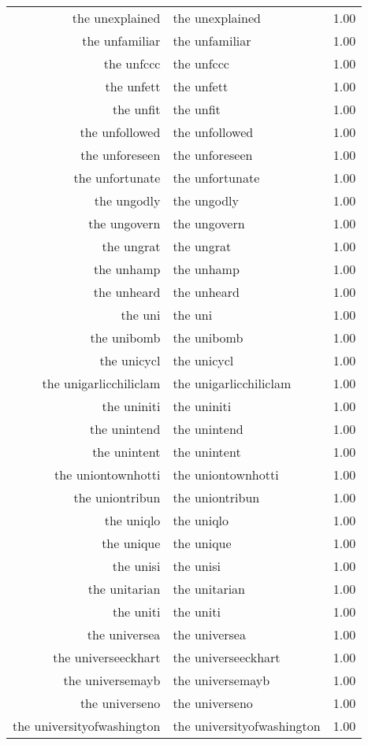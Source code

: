 \begin{table}[ht]
\begin{tabular}{rlr}
  the unexplained & the unexplained & 1.00 \\ 
  the unfamiliar & the unfamiliar & 1.00 \\ 
  the unfccc & the unfccc & 1.00 \\ 
  the unfett & the unfett & 1.00 \\ 
  the unfit & the unfit & 1.00 \\ 
  the unfollowed & the unfollowed & 1.00 \\ 
  the unforeseen & the unforeseen & 1.00 \\ 
  the unfortunate & the unfortunate & 1.00 \\ 
  the ungodly & the ungodly & 1.00 \\ 
  the ungovern & the ungovern & 1.00 \\ 
  the ungrat & the ungrat & 1.00 \\ 
  the unhamp & the unhamp & 1.00 \\ 
  the unheard & the unheard & 1.00 \\ 
  the uni & the uni & 1.00 \\ 
  the unibomb & the unibomb & 1.00 \\ 
  the unicycl & the unicycl & 1.00 \\ 
  the unigarlicchiliclam & the unigarlicchiliclam & 1.00 \\ 
  the uniniti & the uniniti & 1.00 \\ 
  the unintend & the unintend & 1.00 \\ 
  the unintent & the unintent & 1.00 \\ 
  the uniontownhotti & the uniontownhotti & 1.00 \\ 
  the uniontribun & the uniontribun & 1.00 \\ 
  the uniqlo & the uniqlo & 1.00 \\ 
  the unique & the unique & 1.00 \\ 
  the unisi & the unisi & 1.00 \\ 
  the unitarian & the unitarian & 1.00 \\ 
  the uniti & the uniti & 1.00 \\ 
  the universea & the universea & 1.00 \\ 
  the universeeckhart & the universeeckhart & 1.00 \\ 
  the universemayb & the universemayb & 1.00 \\ 
  the universeno & the universeno & 1.00 \\ 
  the universityofwashington & the universityofwashington & 1.00 \\ 

\end{tabular}
\end{table}
